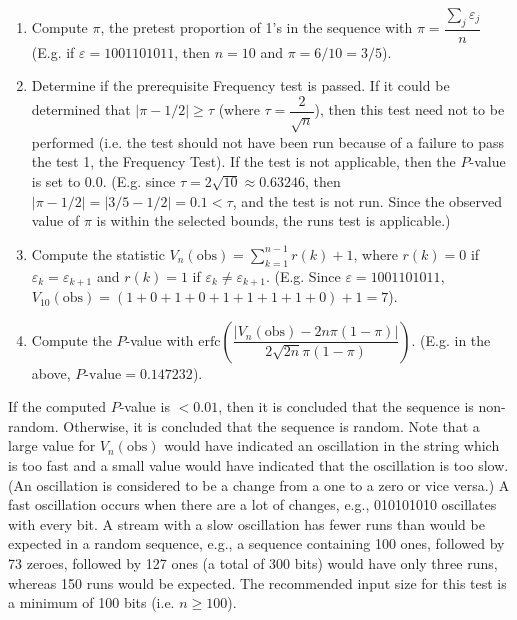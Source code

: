 \begin{enumerate}
    \item Compute $\pi$, the pretest proportion of 1's in the sequence with $\pi = \dfrac{\sum_j \varepsilon_j}{n}$ (E.g. if $\varepsilon = 1001101011$, then $n = 10$ and $\pi = 6/10 = 3/5$).
    
    \item Determine if the prerequisite Frequency test is passed. If it could be determined that $\lvert \pi - 1/2 \rvert \geq \tau$ (where $\tau = \dfrac{2}{\sqrt{n}}$), then this test need not to be performed (i.e. the test should not have been run because of a failure to pass the test 1, the Frequency Test). If the test is not applicable, then the $P$-value is set to 0.0. (E.g. since $\tau = 2\sqrt{10} \approx 0.63246$, then $\lvert \pi - 1/2 \rvert = \lvert 3/5 - 1/2 \rvert = 0.1 < \tau$, and the test is not run. Since the observed value of $\pi$ is within the selected bounds, the runs test is applicable.)
    
    \item Compute the statistic $V_n(\text{obs}) = \sum_{k=1}^{n-1}r(k) + 1$, where $r(k) = 0$ if $\varepsilon_k = \varepsilon_{k+1}$ and $r(k) = 1$ if $\varepsilon_k \ne \varepsilon_{k+1}$.  (E.g. Since $\varepsilon = 1001101011$, $V_{10}(\text{obs}) = (1+0+1+0+1+1+1+1+0)+1=7$).
    
    \item Compute the $P$-value with $\text{erfc}(\dfrac{\lvert V_n(\text{obs}) - 2n\pi(1-\pi)\rvert}{2\sqrt{2n}\pi(1-\pi)})$. (E.g. in the above, $P\text{-value} = 0.147232$).
\end{enumerate}

If the computed $P$-value is $< 0.01$, then it is concluded that the sequence is non-random. Otherwise, it is concluded that the sequence is random. Note that a large value for $V_n(\text{obs})$ would have indicated an oscillation in the string which is too fast and a small value would have indicated that the oscillation is too slow. (An oscillation is considered to be a change from a one to a zero or vice versa.) A fast oscillation occurs when there are a lot of changes, e.g., 010101010 oscillates with every bit. A stream with a slow oscillation has fewer runs than would be expected in a random sequence, e.g., a sequence containing 100 ones, followed by 73 zeroes, followed by 127 ones (a total of 300 bits) would have only three runs, whereas 150 runs would be expected\cite{rep_nist_sp_80022}. The recommended input size for this test is a minimum of 100 bits (i.e. $n \geq 100$).

